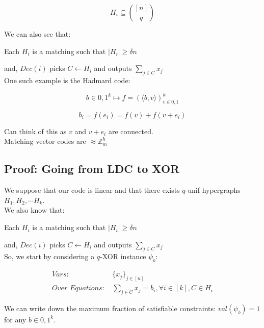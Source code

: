 \documentclass{article}
\begin{document}
\begin{equation*}
H_i \subseteq {[n] \choose q}
\end{equation*}

\noindent We can also see that:

\noindent Each $H_i$ is a matching such that $|H_i| \geq \delta n$

\noindent and, $Dec(i)$ picks $C \leftarrow H_i$ and outputs $\sum_{j \in C} x_j$\\

\noindent One such example is the Hadmard code:

\begin{equation}
b \in {0,1}^k \mapsto f = (\langle b, v \rangle)_{v \in {0,1}}^k
\end{equation}

\begin{equation*}
b_i = f(e_i) = f(v) + f(v+e_i)
\end{equation*}

\noindent Can think of this as $v$ and $v+e_i$ are connected.\\

\noindent Matching vector codes are $\approx \mathbb{Z} _{m}^{h}$

\subsection{Proof: Going from LDC to XOR}

We suppose that our code is linear and that there exists $q$-unif hypergraphs ${H_1, H_2, \cdots H_k}$.\\

\noindent We also know that:

Each $H_i$ is a matching such that $|H_i| \geq \delta n$

and, $Dec(i)$ picks $C \leftarrow H_i$ and outputs $\sum_{j \in C} x_j$\\

\noindent So, we start by considering a $q$-XOR instance $\psi_b$:

\begin{equation*}
\begin{split}
    \textit{Vars: } & \{x_j\}_{j \in [n]}\\
    \textit{Over Equations: } & \sum_{j \in C} x_j = b_i, \forall i \in [k], C \in H_i
\end{split}
\end{equation*}

\noindent We can write down the maximum fraction of satisfiable constraints: $val(\psi_b) = 1$ for any $b \in {0,1}^k$.\\
\end{document}
